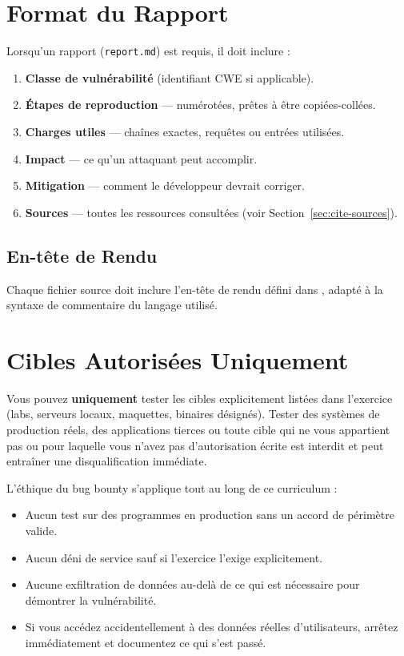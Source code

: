 \section{Format du Rapport}

Lorsqu'un rapport (\texttt{report.md}) est requis, il doit inclure :

\begin{enumerate}
  \item \textbf{Classe de vuln\'erabilit\'e} (identifiant CWE si applicable).
  \item \textbf{Étapes de reproduction} --- num\'erot\'ees, pr\^etes
        \`a \^etre copi\'ees-coll\'ees.
  \item \textbf{Charges utiles} --- chaînes exactes, requ\^etes ou
        entr\'ees utilis\'ees.
  \item \textbf{Impact} --- ce qu'un attaquant peut accomplir.
  \item \textbf{Mitigation} --- comment le d\'eveloppeur devrait corriger.
  \item \textbf{Sources} --- toutes les ressources consult\'ees (voir
        Section~\ref{sec:cite-sources}).
\end{enumerate}

\subsection*{En-t\^ete de Rendu}

Chaque fichier source doit inclure l'en-t\^ete de rendu d\'efini dans
, adapt\'e
\`a la syntaxe de commentaire du langage utilis\'e.

\section{Cibles Autoris\'ees Uniquement}

\begin{warning}
  Vous pouvez \textbf{uniquement} tester les cibles explicitement list\'ees
  dans l'exercice (labs, serveurs locaux, maquettes, binaires d\'esign\'es).
  Tester des syst\`emes de production r\'eels, des applications tierces
  ou toute cible qui ne vous appartient pas ou pour laquelle vous n'avez
  pas d'autorisation \'ecrite est interdit et peut entraîner une
  disqualification imm\'ediate.
\end{warning}

L'\'ethique du bug bounty s'applique tout au long de ce curriculum :
\begin{itemize}
  \item Aucun test sur des programmes en production sans un accord de
        p\'erim\`etre valide.
  \item Aucun d\'eni de service sauf si l'exercice l'exige explicitement.
  \item Aucune exfiltration de donn\'ees au-del\`a de ce qui est
        n\'ecessaire pour d\'emontrer la vuln\'erabilit\'e.
  \item Si vous acc\'edez accidentellement \`a des donn\'ees r\'eelles
        d'utilisateurs, arr\^etez imm\'ediatement et documentez ce qui
        s'est pass\'e.
\end{itemize}

